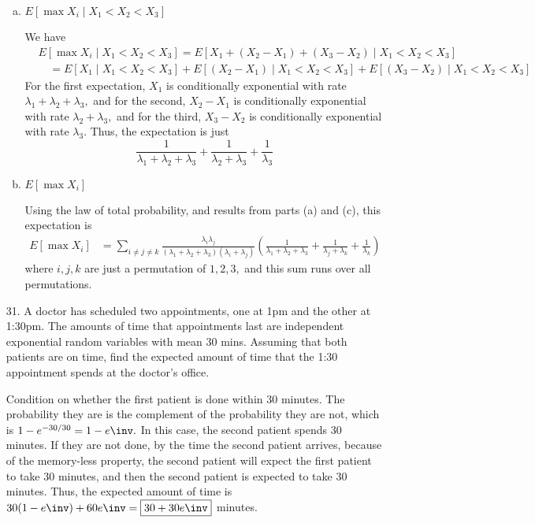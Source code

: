 \documentclass{article}
\begin{document}
\begin{itemize}
\begin{enumerate}[(a)]
			\item $E[\max X_i\mid X_1<X_2<X_3]$
				\begin{soln}
					We have
					\begin{align*}
						&E[\max X_i\mid X_1<X_2<X_3] = E[X_1+(X_2-X_1)+(X_3-X_2)\mid X_1<X_2<X_3] \\
						&\quad= E[X_1\mid X_1<X_2<X_3] + E[(X_2-X_1)\mid X_1<X_2<X_3] + E[(X_3-X_2)\mid X_1<X_2<X_3]
					\end{align*}
					For the first expectation, $X_1$ is conditionally exponential with rate $\lambda_1+\lambda_2+\lambda_3,$ and for the second, $X_2-X_1$ is conditionally exponential with rate $\lambda_2+\lambda_3,$ and for the third, $X_3-X_2$ is conditionally exponential with rate $\lambda_3.$ Thus, the expectation is just
					\[\frac{1}{\lambda_1+\lambda_2+\lambda_3} + \frac{1}{\lambda_2+\lambda_3} + \frac{1}{\lambda_3}\]
				\end{soln}

			\item $E[\max X_i]$
				\begin{soln}
					Using the law of total probability, and results from parts (a) and (c), this expectation is
					\begin{align*}
						E[\max X_i] &= \sum_{i\neq j\neq k}^{}\frac{\lambda_i\lambda_j}{(\lambda_1+\lambda_2+\lambda_3)(\lambda_i+\lambda_j)}\left( \frac{1}{\lambda_1+\lambda_2+\lambda_3} + \frac{1}{\lambda_j+\lambda_k} + \frac{1}{\lambda_k} \right)
					\end{align*}
					where $i, j, k$ are just a permutation of $1, 2, 3,$ and this sum runs over all permutations.
				\end{soln}

		\end{enumerate}

	\item[31.] A doctor has scheduled two appointments, one at 1pm and the other at 1:30pm. The amounts of time that appointments last are independent exponential random variables with mean 30 mins. Assuming that both patients are on time, find the expected amount of time that the 1:30 appointment spends at the doctor's office.
		\begin{soln}
			Condition on whether the first patient is done within 30 minutes. The probability they are is the complement of the probability they are not, which is $1-e^{-30/30} = 1-e\inv.$ In this case, the second patient spends 30 minutes. If they are not done, by the time the second patient arrives, because of the memory-less property, the second patient will expect the first patient to take 30 minutes, and then the second patient is expected to take 30 minutes. Thus, the expected amount of time is $30(1-e\inv) + 60e\inv = \boxed{30+30e\inv}$ minutes.
		\end{soln}


\end{itemize}
\end{document}
